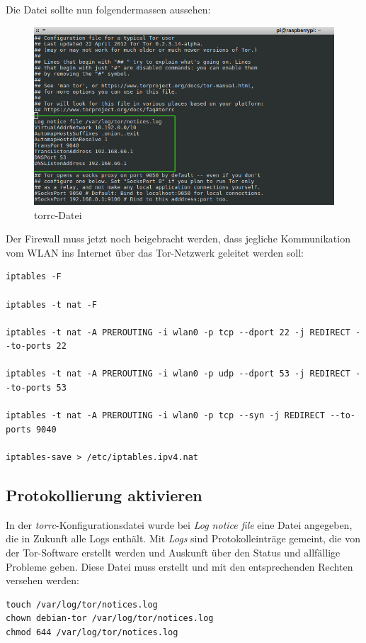 Die Datei sollte nun folgendermassen aussehen: 

\begin{figure}[H]
\centering
\includegraphics[scale=0.6]{images/torrc}
\caption{torrc-Datei}
\end{figure}
 	
Der Firewall muss jetzt noch beigebracht werden, dass jegliche Kommunikation vom WLAN ins Internet über das Tor-Netzwerk geleitet werden soll:

\begin{lstlisting}
iptables -F

iptables -t nat -F

iptables -t nat -A PREROUTING -i wlan0 -p tcp --dport 22 -j REDIRECT --to-ports 22

iptables -t nat -A PREROUTING -i wlan0 -p udp --dport 53 -j REDIRECT --to-ports 53

iptables -t nat -A PREROUTING -i wlan0 -p tcp --syn -j REDIRECT --to-ports 9040

iptables-save > /etc/iptables.ipv4.nat
\end{lstlisting}

\subsection{Protokollierung aktivieren}
In der \textit{torrc}-Konfigurationsdatei wurde bei \textit{Log notice file} eine Datei angegeben, die in Zukunft alle Logs enthält. Mit \textit{Logs} sind Protokolleinträge gemeint, die von der Tor-Software erstellt werden und Auskunft über den Status und allfällige Probleme geben. Diese Datei muss erstellt und mit den entsprechenden Rechten versehen werden:

\begin{lstlisting}
touch /var/log/tor/notices.log
chown debian-tor /var/log/tor/notices.log
chmod 644 /var/log/tor/notices.log
\end{lstlisting}

